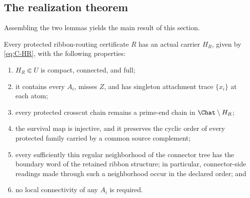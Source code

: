\subsection*{The realization theorem}
Assembling the two lemmas yields the main result of this section.

\begin{theorem}\label{thm:realization}
Every protected ribbon-routing certificate $R$ has an actual carrier
$H_R$, given by \eqref{eq:C-HR}, with the following properties:
\begin{enumerate}
\item $H_R\Subset U$ is compact, connected, and full;
\item it contains every $A_i$, misses $Z$, and has singleton attachment
trace $\{x_i\}$ at each atom;
\item every protected crosscut chain remains a prime-end chain in
$\Chat\setminus H_R$;
\item the survival map is injective, and it preserves the cyclic order of
every protected family carried by a common source complement;
\item every sufficiently thin regular neighborhood of the connector tree
has the boundary word of the retained ribbon structure; in particular,
connector-side readings made through such a neighborhood occur in the
declared order; and
\item no local connectivity of any $A_i$ is required.
\end{enumerate}
\end{theorem}

